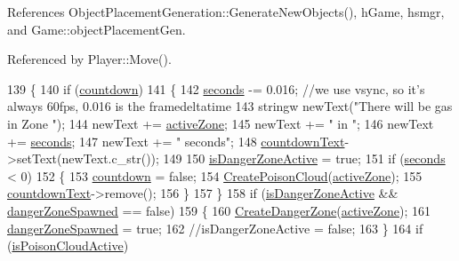 References Object\-Placement\-Generation\-::\-Generate\-New\-Objects(), h\-Game, hsmgr, and Game\-::object\-Placement\-Gen.



Referenced by Player\-::\-Move().


\begin{DoxyCode}
139 \{
140     \textcolor{keywordflow}{if} (\hyperlink{class_heat_map_manager_a659cbc23eff012306ca58bb794d9a9c1}{countdown})
141     \{
142         \hyperlink{class_heat_map_manager_a506cd0b3cef22e132ae74b5b8d264ed4}{seconds} -= 0.016; \textcolor{comment}{//we use vsync, so it's always 60fps, 0.016 is the framedeltatime}
143         stringw newText(\textcolor{stringliteral}{"There will be gas in Zone "});
144         newText += \hyperlink{class_heat_map_manager_a96bfbcb9d6326e12f37db7a9c4fd1e10}{activeZone};
145         newText += \textcolor{stringliteral}{" in "};
146         newText += \hyperlink{class_heat_map_manager_a506cd0b3cef22e132ae74b5b8d264ed4}{seconds};
147         newText += \textcolor{stringliteral}{" seconds"};
148         \hyperlink{class_heat_map_manager_a6cbba801f3d09c86fa63a05180cd181e}{countdownText}->setText(newText.c\_str());
149 
150         \hyperlink{class_heat_map_manager_aa8c35fb977284623b8399a7150f68cc9}{isDangerZoneActive} = \textcolor{keyword}{true};
151         \textcolor{keywordflow}{if} (\hyperlink{class_heat_map_manager_a506cd0b3cef22e132ae74b5b8d264ed4}{seconds} < 0)
152         \{
153             \hyperlink{class_heat_map_manager_a659cbc23eff012306ca58bb794d9a9c1}{countdown} = \textcolor{keyword}{false};
154             \hyperlink{class_heat_map_manager_a7c87473222fd1fa2acf6672a23f303a2}{CreatePoisonCloud}(\hyperlink{class_heat_map_manager_a96bfbcb9d6326e12f37db7a9c4fd1e10}{activeZone});
155             \hyperlink{class_heat_map_manager_a6cbba801f3d09c86fa63a05180cd181e}{countdownText}->remove();
156         \}
157     \}
158     \textcolor{keywordflow}{if} (\hyperlink{class_heat_map_manager_aa8c35fb977284623b8399a7150f68cc9}{isDangerZoneActive} && \hyperlink{class_heat_map_manager_a9a257b4ffed8cf8c2eaa8c71bf0fa75b}{dangerZoneSpawned} == \textcolor{keyword}{false})
159     \{
160         \hyperlink{class_heat_map_manager_a5e270576638ad384789c184b0893c54d}{CreateDangerZone}(\hyperlink{class_heat_map_manager_a96bfbcb9d6326e12f37db7a9c4fd1e10}{activeZone});
161         \hyperlink{class_heat_map_manager_a9a257b4ffed8cf8c2eaa8c71bf0fa75b}{dangerZoneSpawned} = \textcolor{keyword}{true};
162         \textcolor{comment}{//isDangerZoneActive = false;}
163     \}
164     \textcolor{keywordflow}{if} (\hyperlink{class_heat_map_manager_affcd194d19a8b51c54bce180d1ca2393}{isPoisonCloudActive})

\end{DoxyCode}
